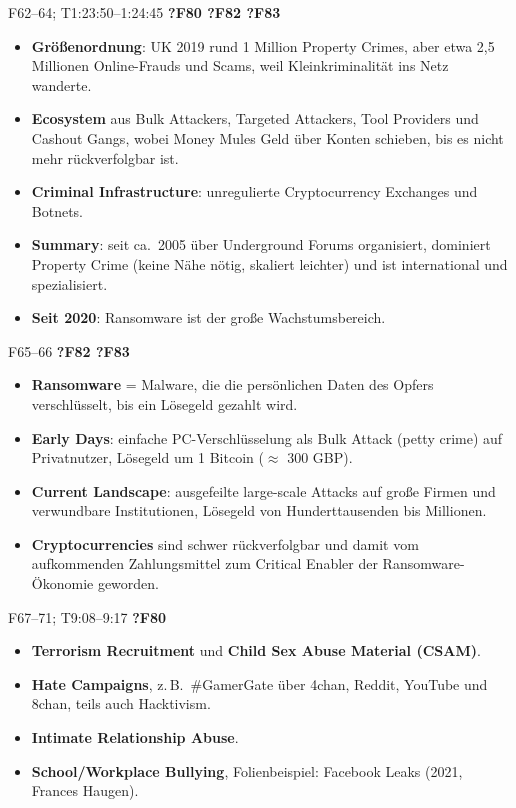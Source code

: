 \documentclass[10pt,a4paper]{article}
\newcommand{\block}[2]{\par\vspace{3pt}{\bfseries #1}\hfill{\scriptsize #2}\par\nopagebreak}
\begin{document}
\block{Crooks: Cybercrime Ecosystem}{F62--64; T1:23:50--1:24:45 \quad \textbf{?F80 ?F82 ?F83}}
\begin{itemize}
\item \textbf{Größenordnung}: UK 2019 rund 1 Million Property Crimes, aber etwa 2,5 Millionen Online-Frauds und Scams, weil Kleinkriminalität ins Netz wanderte.
\item \textbf{Ecosystem} aus Bulk Attackers, Targeted Attackers, Tool Providers und Cashout Gangs, wobei Money Mules Geld über Konten schieben, bis es nicht mehr rückverfolgbar ist.
\item \textbf{Criminal Infrastructure}: unregulierte Cryptocurrency Exchanges und Botnets.
\item \textbf{Summary}: seit ca.\ 2005 über Underground Forums organisiert, dominiert Property Crime (keine Nähe nötig, skaliert leichter) und ist international und spezialisiert.
\item \textbf{Seit 2020}: Ransomware ist der große Wachstumsbereich.
\end{itemize}
\block{Ransomware: Entwicklung}{F65--66 \quad \textbf{?F82 ?F83}}
\begin{itemize}
\item \textbf{Ransomware} = Malware, die die persönlichen Daten des Opfers verschlüsselt, bis ein Lösegeld gezahlt wird.
\item \textbf{Early Days}: einfache PC-Verschlüsselung als Bulk Attack (petty crime) auf Privatnutzer, Lösegeld um 1 Bitcoin ($\approx$ 300 GBP).
\item \textbf{Current Landscape}: ausgefeilte large-scale Attacks auf große Firmen und verwundbare Institutionen, Lösegeld von Hunderttausenden bis Millionen.
\item \textbf{Cryptocurrencies} sind schwer rückverfolgbar und damit vom aufkommenden Zahlungsmittel zum Critical Enabler der Ransomware-Ökonomie geworden.
\end{itemize}
\block{The Swamp: Motiv Abuse}{F67--71; T9:08--9:17 \quad \textbf{?F80}}
\begin{itemize}
\item \textbf{Terrorism Recruitment} und \textbf{Child Sex Abuse Material (CSAM)}.
\item \textbf{Hate Campaigns}, z.\,B.\ \#GamerGate über 4chan, Reddit, YouTube und 8chan, teils auch Hacktivism.
\item \textbf{Intimate Relationship Abuse}.
\item \textbf{School/Workplace Bullying}, Folienbeispiel: Facebook Leaks (2021, Frances Haugen).
\end{itemize}
\end{document}
